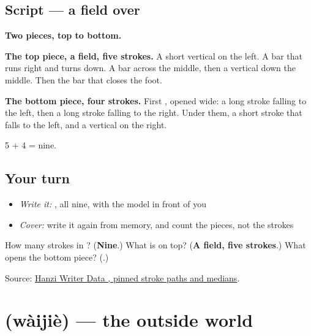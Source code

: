 \subsection*{Script — a field over }

\begin{quote}
\end{quote}

\textbf{Two pieces, top to bottom.}

\textbf{The top piece, a field, five strokes.} A short vertical on the left. A bar that runs right and turns down. A bar across the middle, then a vertical down the middle. Then the bar that closes the foot.

\textbf{The bottom piece, four strokes.} First , opened wide: a long stroke falling to the left, then a long stroke falling to the right. Under them, a short stroke that falls to the left, and a vertical on the right.

5 + 4 = nine.

\subsection*{Your turn}
\begin{itemize}
\raggedright
  \item \emph{Write it:} , all nine, with the model in front of you
  \item \emph{Cover:} write it again from memory, and count the pieces, not the strokes
\end{itemize}

\begin{tcolorbox}[breakable,colback=teal!4,colframe=teal!35!black,title={Before you move on}]
How many strokes in ? (\textbf{Nine}.) What is on top? (\textbf{A field, five strokes}.) What opens the bottom piece? (\textbf{}.)

Source: \href{https://raw.githubusercontent.com/chanind/hanzi-writer-data/68d10a4b21150cae5e1ebbd223eed289cf32d90c/data/\%E7\%95\%8C.json}{Hanzi Writer Data , pinned stroke paths and medians}.
\end{tcolorbox}
\section[\texorpdfstring{\zh{外界} (wàijiè)}{外界 (wàijiè)}]{ (wàijiè) — the outside world}

